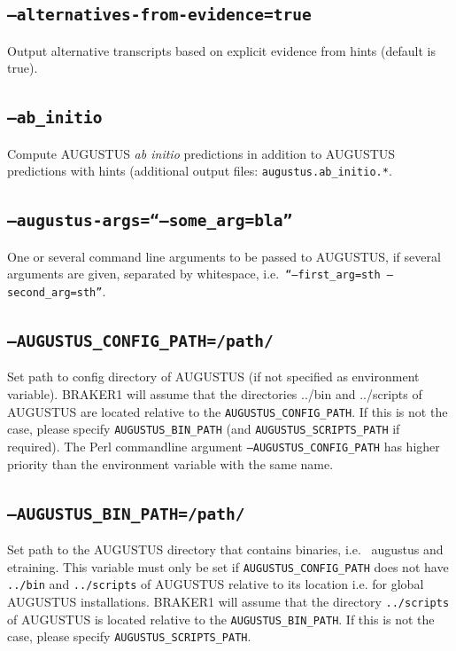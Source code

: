 \documentclass[a4paper,10pt]{report}
\begin{document}
\subsection{\texttt{--alternatives-from-evidence=true}}    

Output alternative transcripts based on explicit evidence from hints (default is true).

\subsection{\texttt{--ab\_initio}}

Compute AUGUSTUS \textit{ab initio} predictions in addition to AUGUSTUS predictions with hints (additional output files: \texttt{augustus.ab\_initio.*}.

\subsection{\texttt{--augustus-args=``--some\_arg=bla''}}     
One or several command line arguments to be passed to AUGUSTUS, if several arguments are given, separated by whitespace, i.e.~\texttt{``--first\_arg=sth --second\_arg=sth''}. 
    
\subsection{\texttt{--AUGUSTUS\_CONFIG\_PATH=/path/}}
Set path to config directory of AUGUSTUS (if not specified as 
                                         environment variable). BRAKER1 will assume that the directories
                                         ../bin and ../scripts of AUGUSTUS are located relative to
                                         the \texttt{AUGUSTUS\_CONFIG\_PATH}. If this is not the case, please
                                         specify \texttt{AUGUSTUS\_BIN\_PATH} (and \texttt{AUGUSTUS\_SCRIPTS\_PATH} if required).
                                         The Perl commandline argument \texttt{--AUGUSTUS\_CONFIG\_PATH} has higher
                                         priority than the environment variable with the same name.
                                         
\subsection{\texttt{--AUGUSTUS\_BIN\_PATH=/path/}}           Set path to the AUGUSTUS directory that contains binaries, i.e.~
    					 augustus and etraining. This variable must only be set if 
    					 \texttt{AUGUSTUS\_CONFIG\_PATH} does not have \texttt{../bin} and \texttt{../scripts} of
    					 AUGUSTUS relative to its location i.e. for global AUGUSTUS 
    					 installations. BRAKER1 will assume that the directory
    					 \texttt{../scripts} of AUGUSTUS is located relative to the \texttt{AUGUSTUS\_BIN\_PATH}.
If this is not the case, please specify \texttt{AUGUSTUS\_SCRIPTS\_PATH}.
\end{document}
